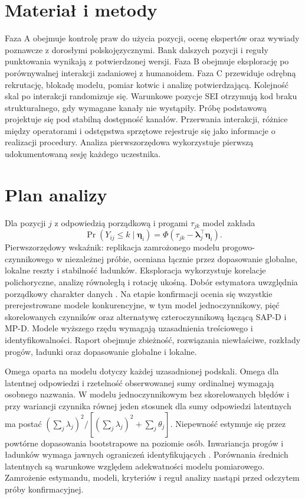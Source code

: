 \documentclass[11pt,a4paper]{article}
\begin{document}
\section{Materiał i metody}
Faza A obejmuje kontrolę praw do użycia pozycji, ocenę ekspertów oraz wywiady poznawcze z dorosłymi polskojęzycznymi. Bank dalszych pozycji i reguły punktowania wynikają z potwierdzonej wersji. Faza B obejmuje eksplorację po porównywalnej interakcji zadaniowej z humanoidem. Faza C przewiduje odrębną rekrutację, blokadę modelu, pomiar kotwic i analizę potwierdzającą. Kolejność skal po interakcji randomizuje się. Warunkowe pozycje SEI otrzymują kod braku strukturalnego, gdy wymagane kanały nie wystąpiły. Próbę podstawową projektuje się pod stabilną dostępność kanałów. Przerwania interakcji, różnice między operatorami i odstępstwa sprzętowe rejestruje się jako informacje o realizacji procedury. Analiza pierwszorzędowa wykorzystuje pierwszą udokumentowaną sesję każdego uczestnika.

\section{Plan analizy}
Dla pozycji $j$ z odpowiedzią porządkową i progami $\tau_{jk}$ model zakłada
\[
 \Pr(Y_{ij}\leq k\mid\boldsymbol\eta_i)
 =\Phi(\tau_{jk}-\boldsymbol\lambda_j^\top\boldsymbol\eta_i).
\]
Pierwszorzędowy wskaźnik: replikacja zamrożonego modelu progowo-czynnikowego w niezależnej próbie, oceniana łącznie przez dopasowanie globalne, lokalne reszty i stabilność ładunków. Eksploracja wykorzystuje korelacje polichoryczne, analizę równoległą i rotację ukośną. Dobór estymatora uwzględnia porządkowy charakter danych \citep{flora}. Na etapie konfirmacji ocenia się wszystkie prerejestrowane modele konkurencyjne, w tym model jednoczynnikowy, pięć skorelowanych czynników oraz alternatywę czteroczynnikową łączącą SAP-D i MP-D. Modele wyższego rzędu wymagają uzasadnienia treściowego i identyfikowalności. Raport obejmuje zbieżność, rozwiązania niewłaściwe, rozkłady progów, ładunki oraz dopasowanie globalne i lokalne.

Omega oparta na modelu dotyczy każdej uzasadnionej podskali. Omega dla latentnej odpowiedzi i rzetelność obserwowanej sumy ordinalnej wymagają osobnego nazwania. W modelu jednoczynnikowym bez skorelowanych błędów i przy wariancji czynnika równej jeden stosunek dla sumy odpowiedzi latentnych ma postać $(\sum_j\lambda_j)^2/[(\sum_j\lambda_j)^2+\sum_j\theta_j]$. Niepewność estymuje się przez powtórne dopasowania bootstrapowe na poziomie osób. Inwariancja progów i ładunków wymaga jawnych ograniczeń identyfikujących \citep{wu}. Porównania średnich latentnych są warunkowe względem adekwatności modelu pomiarowego. Zamrożenie estymandu, modeli, kryteriów i reguł analizy nastąpi przed odczytem próby konfirmacyjnej.
\end{document}
